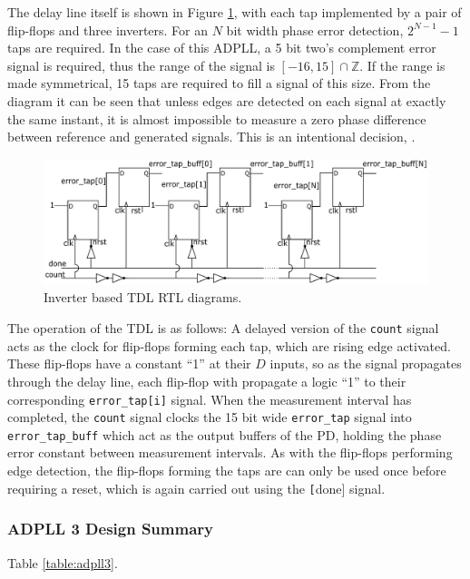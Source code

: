 The delay line itself is shown in Figure \ref{fig:tdl_impl}, with each tap implemented by a pair of flip-flops and three inverters. For an $N$ bit width phase error detection, $2^{N-1}-1$ taps are required. In the case of this \ac{ADPLL}, a 5 bit two's complement error signal is required, thus the range of the signal is $[-16,15]\cap\mathbb{Z}$. If the range is made symmetrical, 15 taps are required to fill a signal of this size. From the diagram it can be seen that unless edges are detected on each signal at exactly the same instant, it is almost impossible to measure a zero phase difference between reference and generated signals. This is an intentional decision, \cite{idkwhattocite}.
\begin{figure}[h]
	\centering
	\includegraphics[width=1.0\textwidth]{../new_pdet2}
	\caption[Inverter based \ac{TDL} RTL diagrams]{Inverter based \ac{TDL} RTL diagrams.}
	\label{fig:tdl_impl}
\end{figure}
The operation of the \ac{TDL} is as follows: A delayed version of the \texttt{count} signal acts as the clock for flip-flops forming each tap, which are rising edge activated. These flip-flops have a constant ``1'' at their $D$ inputs, so as the signal propagates through the delay line, each flip-flop with propagate a logic ``1'' to their corresponding \texttt{error_tap[i]} signal. When the measurement interval has completed, the \texttt{count} signal clocks the 15 bit wide \texttt{error_tap} signal into \texttt{error_tap_buff} which act as the output buffers of the \ac{PD}, holding the phase error constant between measurement intervals. As with the flip-flops performing edge detection, the flip-flops forming the taps are can only be used once before requiring a reset, which is again carried out using the \texttt[done] signal.


\subsubsection{\acs{ADPLL} 3 Design Summary}
Table \ref{table:adpll3}.

